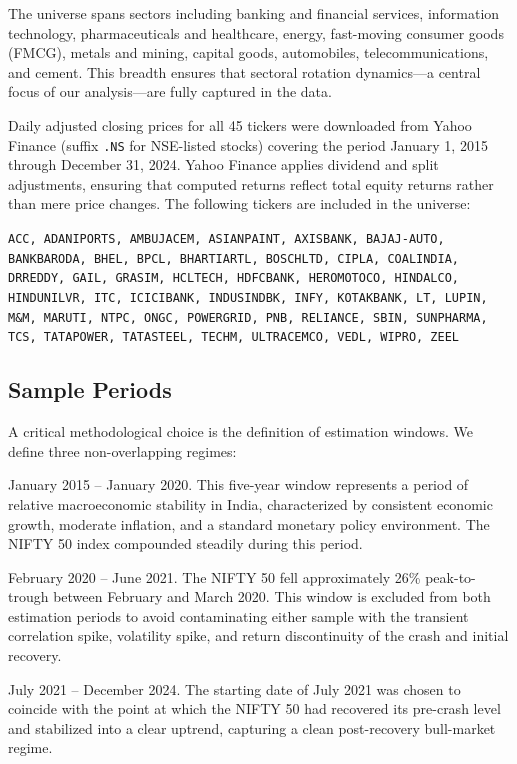 \documentclass[12pt,a4paper]{article}
\begin{document}
The universe spans sectors including banking and financial services, information technology,
pharmaceuticals and healthcare, energy, fast-moving consumer goods (FMCG), metals and
mining, capital goods, automobiles, telecommunications, and cement. This breadth ensures
that sectoral rotation dynamics---a central focus of our analysis---are fully captured in
the data.

Daily adjusted closing prices for all 45 tickers were downloaded from Yahoo Finance
(suffix \texttt{.NS} for NSE-listed stocks) covering the period January 1, 2015 through
December 31, 2024. Yahoo Finance applies dividend and split adjustments, ensuring that
computed returns reflect total equity returns rather than mere price changes. The
following tickers are included in the universe:

\begin{center}
\small
\texttt{ACC, ADANIPORTS, AMBUJACEM, ASIANPAINT, AXISBANK, BAJAJ-AUTO, BANKBARODA,
BHEL, BPCL, BHARTIARTL, BOSCHLTD, CIPLA, COALINDIA, DRREDDY, GAIL, GRASIM, HCLTECH,
HDFCBANK, HEROMOTOCO, HINDALCO, HINDUNILVR, ITC, ICICIBANK, INDUSINDBK, INFY,
KOTAKBANK, LT, LUPIN, M\&M, MARUTI, NTPC, ONGC, POWERGRID, PNB, RELIANCE, SBIN,
SUNPHARMA, TCS, TATAPOWER, TATASTEEL, TECHM, ULTRACEMCO, VEDL, WIPRO, ZEEL}
\end{center}

\subsection{Sample Periods}

A critical methodological choice is the definition of estimation windows. We define three
non-overlapping regimes:

\begin{description}[leftmargin=2em]
    \item[\textbf{Pre-COVID}:] January 2015 -- January 2020. This five-year window
        represents a period of relative macroeconomic stability in India, characterized
        by consistent economic growth, moderate inflation, and a standard monetary policy
        environment. The NIFTY 50 index compounded steadily during this period.
    \item[\textbf{Crisis window} (excluded):] February 2020 -- June 2021. The NIFTY 50
        fell approximately 26\% peak-to-trough between February and March 2020. This
        window is excluded from both estimation periods to avoid contaminating either
        sample with the transient correlation spike, volatility spike, and return
        discontinuity of the crash and initial recovery.
    \item[\textbf{Post-COVID}:] July 2021 -- December 2024. The starting date of July
        2021 was chosen to coincide with the point at which the NIFTY 50 had recovered
        its pre-crash level and stabilized into a clear uptrend, capturing a clean
        post-recovery bull-market regime.
\end{description}
\end{document}
